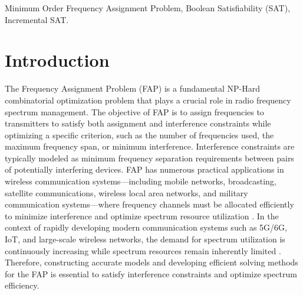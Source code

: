 \documentclass[letterpaper,journal]{IEEEtran}
\begin{document}
\begin{IEEEkeywords}
Minimum Order Frequency Assignment Problem, Boolean Satisfiability (SAT), Incremental SAT.
\end{IEEEkeywords}

\section{Introduction}

The Frequency Assignment Problem (FAP) is a fundamental NP-Hard combinatorial optimization problem \cite{murphey1999fap,Aardal2007,Mahmoudi2023} that plays a crucial role in radio frequency spectrum management. 
The objective of FAP is to assign frequencies to transmitters to satisfy both assignment and interference constraints while optimizing a specific criterion, such as the number of frequencies used, the maximum frequency span, or minimum interference.
Interference constraints are typically modeled as minimum frequency separation requirements between pairs of potentially interfering devices. 
FAP has numerous practical applications in wireless communication systems—including mobile networks, broadcasting, satellite communications, wireless local area networks, and military communication systems—where frequency channels must be allocated efficiently to minimize interference and optimize spectrum resource utilization \cite{Aardal2007,Mahmoudi2023}. 
In the context of rapidly developing modern communication systems such as 5G/6G, IoT, and large-scale wireless networks, the demand for spectrum utilization is continuously increasing while spectrum resources remain inherently limited \cite{Mondal2024,Cuellar2024,Alhussien2024}. 
Therefore, constructing accurate models and developing efficient solving methods for the FAP is essential to satisfy interference constraints and optimize spectrum efficiency.
\end{document}
